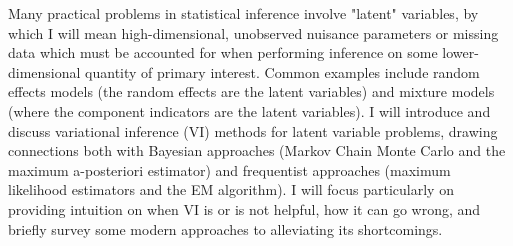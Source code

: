 Many practical problems in statistical inference involve "latent" variables, by
which I will mean high-dimensional, unobserved nuisance parameters or missing
data which must be accounted for when performing inference on some
lower-dimensional quantity of primary interest.  Common examples include random
effects models (the random effects are the latent variables) and mixture models
(where the component indicators are the latent variables).  I will introduce and
discuss variational inference (VI) methods for latent variable problems, drawing
connections both with Bayesian approaches (Markov Chain Monte Carlo and the
maximum a-posteriori estimator) and frequentist approaches (maximum likelihood
estimators and the EM algorithm).  I will focus particularly on providing
intuition on when VI is or is not helpful, how it can go wrong, and briefly
survey some modern approaches to alleviating its shortcomings.

